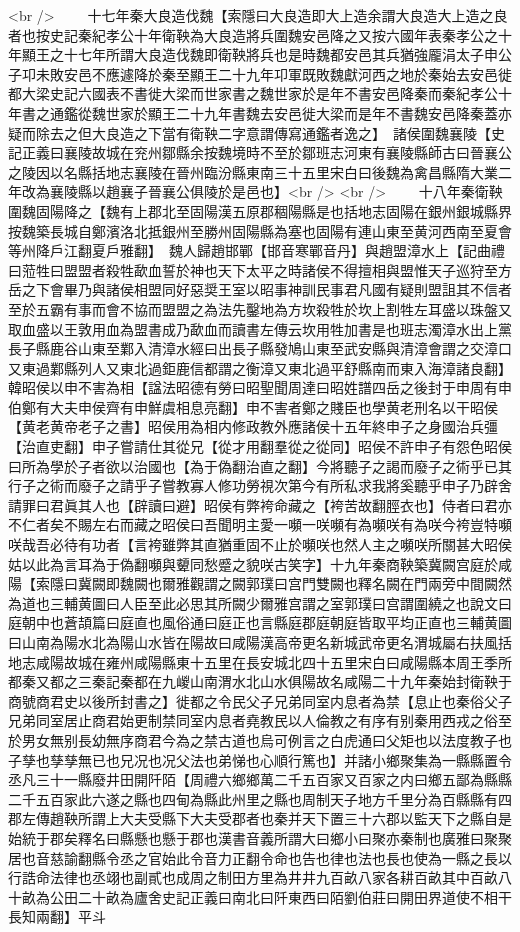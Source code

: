 <br />
　　十七年秦大良造伐魏【索隱曰大良造即大上造余謂大良造大上造之良者也按史記秦紀孝公十年衛鞅為大良造將兵圍魏安邑降之又按六國年表秦孝公之十年顯王之十七年所謂大良造伐魏即衛鞅將兵也是時魏都安邑其兵猶強龎涓太子申公子卭未敗安邑不應遽降於秦至顯王二十九年卭軍既敗魏獻河西之地於秦始去安邑徙都大梁史記六國表不書徙大梁而世家書之魏世家於是年不書安邑降秦而秦紀孝公十年書之通鑑從魏世家於顯王二十九年書魏去安邑徙大梁而是年不書魏安邑降秦蓋亦疑而除去之但大良造之下當有衛鞅二字意謂傳寫通鑑者逸之】　諸侯圍魏襄陵【史記正義曰襄陵故城在兖州鄒縣余按魏境時不至於鄒班志河東有襄陵縣師古曰晉襄公之陵因以名縣括地志襄陵在晉州臨汾縣東南三十五里宋白曰後魏為禽昌縣隋大業二年改為襄陵縣以趙襄子晉襄公俱陵於是邑也】<br />
<br />
　　十八年秦衛鞅圍魏固陽降之【魏有上郡北至固陽漢五原郡稒陽縣是也括地志固陽在銀州銀城縣界按魏築長城自鄭濱洛北抵銀州至勝州固陽縣為塞也固陽有連山東至黄河西南至夏會等州降戶江翻夏戶雅翻】　魏人歸趙邯鄲【邯音寒鄲音丹】與趙盟漳水上【記曲禮曰蒞牲曰盟盟者殺牲歃血誓於神也天下太平之時諸侯不得擅相與盟惟天子巡狩至方岳之下會畢乃與諸侯相盟同好惡奨王室以昭事神訓民事君凡國有疑則盟詛其不信者至於五霸有事而會不協而盟盟之為法先鑿地為方坎殺牲於坎上割牲左耳盛以珠盤又取血盛以王敦用血為盟書成乃歃血而讀書左傳云坎用牲加書是也班志濁漳水出上黨長子縣鹿谷山東至鄴入清漳水經曰出長子縣發鳩山東至武安縣與清漳會謂之交漳口又東過鄴縣列人又東北過鉅鹿信都謂之衡漳又東北過平舒縣南而東入海漳諸良翻】　韓昭侯以申不害為相【諡法昭德有勞曰昭聖聞周達曰昭姓譜四岳之後封于申周有申伯鄭有大夫申侯齊有申鮮虞相息亮翻】申不害者鄭之賤臣也學黄老刑名以干昭侯【黄老黄帝老子之書】昭侯用為相内修政教外應諸侯十五年終申子之身國治兵彊【治直吏翻】申子嘗請仕其從兄【從才用翻羣從之從同】昭侯不許申子有怨色昭侯曰所為學於子者欲以治國也【為于偽翻治直之翻】今將聽子之謁而廢子之術乎已其行子之術而廢子之請乎子嘗教寡人修功勞視次第今有所私求我將奚聽乎申子乃辟舍請罪曰君眞其人也【辟讀曰避】昭侯有弊袴命藏之【袴苦故翻脛衣也】侍者曰君亦不仁者矣不賜左右而藏之昭侯曰吾聞明主愛一嚬一咲嚬有為嚬咲有為咲今袴豈特嚬咲哉吾必待有功者【言袴雖弊其直猶重固不止於嚬咲也然人主之嚬咲所關甚大昭侯姑以此為言耳為于偽翻嚬與顰同愁蹙之貌咲古笑字】十九年秦商鞅築冀闕宫庭於咸陽【索隱曰冀闕即魏闕也爾雅觀謂之闕郭璞曰宫門雙闕也釋名闕在門兩旁中間闕然為道也三輔黄圖曰人臣至此必思其所闕少爾雅宫謂之室郭璞曰宫謂圍繞之也說文曰庭朝中也蒼頡篇曰庭直也風俗通曰庭正也言縣庭郡庭朝庭皆取平均正直也三輔黄圖曰山南為陽水北為陽山水皆在陽故曰咸陽漢高帝更名新城武帝更名渭城屬右扶風括地志咸陽故城在雍州咸陽縣東十五里在長安城北四十五里宋白曰咸陽縣本周王季所都秦又都之三秦記秦都在九嵕山南渭水北山水俱陽故名咸陽二十九年秦始封衛鞅于商號商君史以後所封書之】徙都之令民父子兄弟同室内息者為禁【息止也秦俗父子兄弟同室居止商君始更制禁同室内息者堯教民以人倫教之有序有别秦用西戎之俗至於男女無别長幼無序商君今為之禁古道也烏可例言之白虎通曰父矩也以法度教子也子孳也孳孳無已也兄况也况父法也弟悌也心順行篤也】并諸小鄉聚集為一縣縣置令丞凡三十一縣廢井田開阡陌【周禮六鄉鄉萬二千五百家又百家之内曰鄉五鄙為縣縣二千五百家此六遂之縣也四甸為縣此州里之縣也周制天子地方千里分為百縣縣有四郡左傳趙鞅所謂上大夫受縣下大夫受郡者也秦并天下置三十六郡以監天下之縣自是始統于郡矣釋名曰縣懸也懸于郡也漢書音義所謂大曰鄉小曰聚亦秦制也廣雅曰聚聚居也音慈諭翻縣令丞之官始此令音力正翻令命也告也律也法也長也使為一縣之長以行誥命法律也丞翊也副貳也成周之制田方里為井井九百畝八家各耕百畝其中百畝八十畝為公田二十畝為廬舍史記正義曰南北曰阡東西曰陌劉伯莊曰開田界道使不相干長知兩翻】平斗